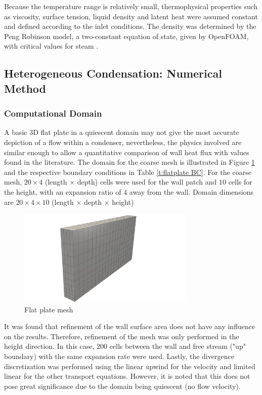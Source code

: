 \documentclass[12pt]{article}
\numberwithin{equation}{section}
\begin{document}
Because the temperature range is relatively small, thermophysical properties such as viscosity, surface tension, liquid density and latent heat were assumed constant and defined according to the inlet conditions. The density was determined by the Peng Robinson model, a two-constant equation of state, given by OpenFOAM, with critical values for steam \cite{pengrobinson}.  
\subsection{Heterogeneous Condensation: Numerical Method}\label{ss:Methodology-Heterogeneous}

\subsubsection{Computational Domain}\label{sss:Methodology-Heterogeneous-Domain}
A basic 3D flat plate in a quiescent domain may not give the most accurate depiction of a flow within a condenser, nevertheless, the physics involved are similar enough to allow a quantitative comparison of wall heat flux with values found in the literature. The domain for the coarse mesh is illustrated in Figure \ref{f:flatplate_Mesh} and the respective boundary conditions in Table \ref{t:flatplate BC}. For the coarse mesh, $20\times 4$ (length $\times$ depth) cells were used for the wall patch and $10$ cells for the height, with an expansion ratio of $4$ away from the wall. Domain dimensions are $20\times 4\times 10$ (length $\times$ depth $\times$ height)  
\begin{figure}[H]
    \centering
    \includegraphics[trim={50 0 200 20},clip,width=0.75\textwidth]{Figures/FlatPlate_Mesh.png}
    \caption{Flat plate mesh }
    \label{f:flatplate_Mesh}
\end{figure}
It was found that refinement of the wall surface area does not have any influence on the results. Therefore, refinement of the mesh was only performed in the height direction. In this case, $200$ cells between the wall and free stream ("up" boundary) with the same expansion rate were used. Lastly, the divergence discretization was performed using the linear upwind for the velocity and limited linear for the other transport equations. However, it is noted that this does not pose great significance due to the domain being quiescent (no flow velocity).   
\end{document}
